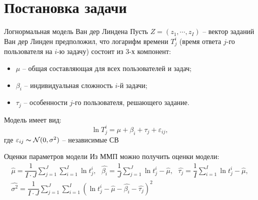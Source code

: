 \documentclass[aspectratio=169]{beamer}
\begin{document}
    \section{Постановка задачи}
    \begin{frame}{Логнормальная модель Ван дер Линдена}
            Пусть $Z=(z_1,\cdots,z_I)$ -- вектор заданий\\
            Ван дер Линден предположил, что логарифм времени $T_j^i$ (время ответа $j$-го пользователя на $i$-ю задачу) состоит из 3-х компонент:
            \begin{itemize}
                \item $\mu$ -- общая составляющая для всех пользователей и задач;
                \item $\beta_i$ -- индивидуальная сложность $i$-й задачи;
                \item $\tau_j$ -- особенности $j$-го пользователя, решающего задание.
            \end{itemize}
            Модель имеет вид:
            \begin{equation}
            \ln T_j^i = \mu + \beta_i + \tau_j + \varepsilon_{ij},
            \end{equation}
            где $\varepsilon_{ij} \thicksim \mathcal{N}(0,\sigma^2)$ -- независимые СВ
    \end{frame}


    \begin{frame}{Оценки параметров модели}
            Из ММП можно получить оценки модели:
            \begin{gather}
                \hat{\mu} = \dfrac{1}{I \cdot J} \sum\limits_{j=1}^J \sum\limits_{i=1}^I \ln t_j^i, ~~~  \hat{\beta_i} = \dfrac{1}{J} \sum\limits_{j=1}^J \ln t_j^i - \hat{\mu}, ~~~  \hat{\tau_j} = \dfrac{1}{I} \sum\limits_{i=1}^I \ln t_j^i - \hat{\mu},\\
                \hat{\sigma^2} = \dfrac{1}{I \cdot J} \sum\limits_{j=1}^J \sum\limits_{i=1}^I \left( \ln t_j^i - \hat{\mu} - \hat{\beta_i} - \hat{\tau_j} \right)^2
            \end{gather}
    \end{frame}
\end{document}

